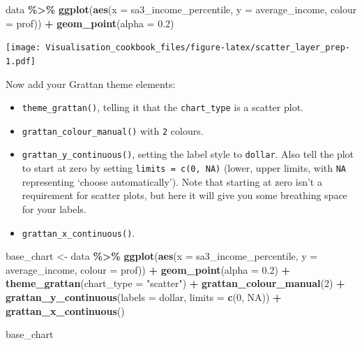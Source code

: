 \documentclass[
]{book}
\newenvironment{Shaded}{\begin{snugshade}}{\end{snugshade}}
\newcommand{\DataTypeTok}[1]{\textcolor[rgb]{0.13,0.29,0.53}{#1}}
\newcommand{\DecValTok}[1]{\textcolor[rgb]{0.00,0.00,0.81}{#1}}
\newcommand{\FloatTok}[1]{\textcolor[rgb]{0.00,0.00,0.81}{#1}}
\newcommand{\KeywordTok}[1]{\textcolor[rgb]{0.13,0.29,0.53}{\textbf{#1}}}
\newcommand{\NormalTok}[1]{#1}
\newcommand{\OperatorTok}[1]{\textcolor[rgb]{0.81,0.36,0.00}{\textbf{#1}}}
\newcommand{\OtherTok}[1]{\textcolor[rgb]{0.56,0.35,0.01}{#1}}
\newcommand{\StringTok}[1]{\textcolor[rgb]{0.31,0.60,0.02}{#1}}
\providecommand{\tightlist}{%
  \setlength{\itemsep}{0pt}\setlength{\parskip}{0pt}}
\begin{document}
\begin{Shaded}
\begin{Highlighting}[]
\NormalTok{data }\OperatorTok{\%\textgreater{}\%}\StringTok{ }
\StringTok{  }\KeywordTok{ggplot}\NormalTok{(}\KeywordTok{aes}\NormalTok{(}\DataTypeTok{x =}\NormalTok{ sa3\_income\_percentile,}
             \DataTypeTok{y =}\NormalTok{ average\_income,}
             \DataTypeTok{colour =}\NormalTok{ prof)) }\OperatorTok{+}
\StringTok{  }\KeywordTok{geom\_point}\NormalTok{(}\DataTypeTok{alpha =} \FloatTok{0.2}\NormalTok{)}
\end{Highlighting}
\end{Shaded}

\texttt{[image: Visualisation\_cookbook\_files/figure-latex/scatter\_layer\_prep-1.pdf]}

Now add your Grattan theme elements:

\begin{itemize}
\tightlist
\item
  \texttt{theme\_grattan()}, telling it that the \texttt{chart\_type} is a scatter plot.
\item
  \texttt{grattan\_colour\_manual()} with \texttt{2} colours.
\item
  \texttt{grattan\_y\_continuous()}, setting the label style to \texttt{dollar}. Also tell the plot to start at zero by setting \texttt{limits\ =\ c(0,\ NA)} (lower, upper limits, with \texttt{NA} representing `choose automatically'). Note that starting at zero isn't a requirement for scatter plots, but here it will give you some breathing space for your labels.
\item
  \texttt{grattan\_x\_continuous()}.
\end{itemize}

\begin{Shaded}
\begin{Highlighting}[]
\NormalTok{base\_chart \textless{}{-}}\StringTok{ }\NormalTok{data }\OperatorTok{\%\textgreater{}\%}\StringTok{ }
\StringTok{  }\KeywordTok{ggplot}\NormalTok{(}\KeywordTok{aes}\NormalTok{(}\DataTypeTok{x =}\NormalTok{ sa3\_income\_percentile,}
             \DataTypeTok{y =}\NormalTok{ average\_income,}
             \DataTypeTok{colour =}\NormalTok{ prof)) }\OperatorTok{+}
\StringTok{  }\KeywordTok{geom\_point}\NormalTok{(}\DataTypeTok{alpha =} \FloatTok{0.2}\NormalTok{) }\OperatorTok{+}\StringTok{ }
\StringTok{  }\KeywordTok{theme\_grattan}\NormalTok{(}\DataTypeTok{chart\_type =} \StringTok{"scatter"}\NormalTok{) }\OperatorTok{+}\StringTok{ }
\StringTok{  }\KeywordTok{grattan\_colour\_manual}\NormalTok{(}\DecValTok{2}\NormalTok{) }\OperatorTok{+}\StringTok{ }
\StringTok{  }\KeywordTok{grattan\_y\_continuous}\NormalTok{(}\DataTypeTok{labels =}\NormalTok{ dollar, }
                       \DataTypeTok{limits =} \KeywordTok{c}\NormalTok{(}\DecValTok{0}\NormalTok{, }\OtherTok{NA}\NormalTok{)) }\OperatorTok{+}\StringTok{ }
\StringTok{  }\KeywordTok{grattan\_x\_continuous}\NormalTok{()}

\NormalTok{base\_chart}
\end{Highlighting}
\end{Shaded}
\end{document}
